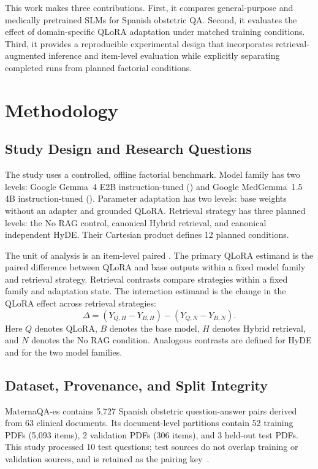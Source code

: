 This work makes three contributions. First, it compares general-purpose and
medically pretrained SLMs for Spanish obstetric QA. Second, it evaluates
the effect of domain-specific QLoRA adaptation under matched training
conditions. Third, it provides a reproducible experimental design that
incorporates retrieval-augmented inference and item-level evaluation while
explicitly separating completed runs from planned factorial conditions.

\section{Methodology}
\subsection{Study Design and Research Questions}
The study uses a controlled, offline factorial benchmark. Model family has
two levels: Google Gemma~4 E2B instruction-tuned
() and Google MedGemma~1.5 4B instruction-tuned
(). Parameter adaptation has two levels:
base weights without an adapter and grounded QLoRA. Retrieval strategy has
three planned levels: the No RAG control, canonical
Hybrid retrieval, and canonical independent HyDE. Their Cartesian product
defines 12 planned conditions.

The unit of analysis is an item-level paired . The primary
QLoRA estimand is the paired difference between QLoRA and base outputs
within a fixed model family and retrieval strategy. Retrieval contrasts
compare strategies within a fixed family and adaptation state. The
interaction estimand is the change in the QLoRA effect across retrieval
strategies:
\begin{equation}
\label{eq:interaction}
\Delta = (Y_{Q,H} - Y_{B,H}) - (Y_{Q,N} - Y_{B,N}).
\end{equation}
Here $Q$ denotes QLoRA, $B$ denotes the base model, $H$ denotes Hybrid
retrieval, and $N$ denotes the No RAG condition. Analogous contrasts
are defined for HyDE and for the two model families.

\subsection{Dataset, Provenance, and Split Integrity}
MaternaQA-es contains 5,727 Spanish obstetric question-answer pairs derived
from 63 clinical documents. Its document-level partitions contain 52
training PDFs (5,093 items), 2 validation PDFs (306 items), and 3 held-out
test PDFs. This study processed 10 test questions; test
sources do not overlap training or validation sources, and  is
retained as the pairing key~\cite{maternaqa2026}.

